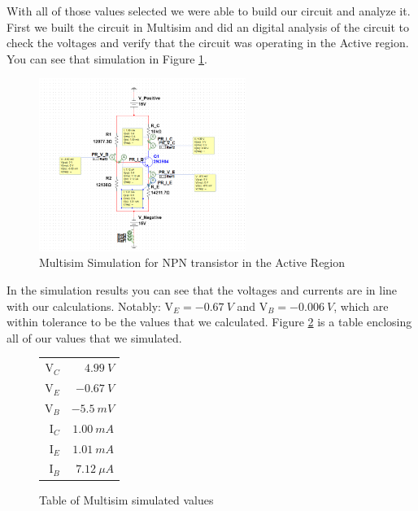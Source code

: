 \documentclass{article}
\begin{document}
With all of those values selected we were able to build
our circuit and analyze it. First we built the circuit in
Multisim and did an digital analysis of the circuit to
check the voltages and verify that the circuit was 
operating in the Active region. You can see that simulation
in Figure \ref{fig:multisimPart1}.

\begin{figure}[h!]
  \begin{center}
  \includegraphics[width=0.6\textwidth]{Multisim Simulation Image.png}
  \caption{Multisim Simulation for NPN transistor
  in the Active Region}
  \label{fig:multisimPart1}
  \end{center}
\end{figure}

In the simulation results you can see that the voltages
and currents are in line with our calculations.
Notably: V$_E=\SI{-0.67}{V}$ and V$_B=\SI{-0.006}{V}$,
which are within tolerance to be the values that
we calculated. Figure \ref{table:activeTableSim} is
a table enclosing all of our values that we simulated.

\begin{figure}
  \begin{center}
    \begin{tabular}{r|r}
      V$_C$ & $\SI{4.99}{V}$ \\
      V$_E$ & $\SI{-0.67}{V}$ \\
      V$_B$ & $\SI{-5.5}{mV}$ \\
      I$_C$ & $\SI{1.00}{mA}$ \\
      I$_E$ & $\SI{1.01}{mA}$ \\
      I$_B$ & $\SI{7.12}{\mu A}$ \\

    \end{tabular}
  \end{center}
  \caption{Table of Multisim simulated values}
  \label{table:activeTableSim}
\end{figure}
\end{document}
